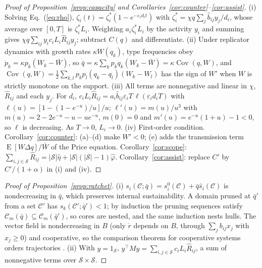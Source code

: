 \documentclass[letterpaper]{article} %
\theoremstyle{definition}
\newcommand{\cC}{\mathcal{C}}
\newcommand{\cS}{\mathcal{S}}
\begin{document}
\begin{proof}[Proof of Proposition~\ref{prop:capacity} and Corollaries~\ref{cor:counter}--\ref{cor:assist}]
(i) Solving Eq.~(\ref{eq:rho}), $\zeta_i(t)=\zeta^\ast_i(1-e^{-\varepsilon_id_it})$ with $\zeta^\ast_i=\chi q\sum_j\hat b_{ij}y_j/d_i$, whose average over $[0,T]$ is $\zeta^\ast_iL_i$. Weighting $a_i\zeta^\ast_iL_i$ by the activity $y_i$ and summing gives $\chi q\sum_{ij}y_ic_iL_i\hat R_{ij}y_j$; subtract $C(q)$ and differentiate. (ii) Under replicator dynamics with growth rates $\kappa W(q_k)$, type frequencies obey $\dot p_k=\kappa p_k(W_k-\bar W)$, so $\dot{\bar q}=\kappa\sum_kp_kq_k(W_k-\bar W)=\kappa\operatorname{Cov}(q,W)$, and $\operatorname{Cov}(q,W)=\tfrac12\sum_{k,l}p_kp_l(q_k-q_l)(W_k-W_l)$ has the sign of $W'$ when $W$ is strictly monotone on the support. (iii) All terms are nonnegative and linear in $\chi$, $\hat R_{ij}$ and each $y_j$. For $d_i$, $c_iL_i\hat R_{ij}=a_i\hat b_{ij}\varepsilon_iT\,\ell(\varepsilon_id_iT)$ with $\ell(u)=[1-(1-e^{-u})/u]/u$; $\ell'(u)=m(u)/u^3$ with $m(u)=2-2e^{-u}-u-ue^{-u}$, $m(0)=0$ and $m'(u)=e^{-u}(1+u)-1<0$, so $\ell$ is decreasing. As $T\to0$, $L_i\to0$. (iv) First-order condition. Corollary~\ref{cor:counter}: (a)--(d) make $W'<0$; (e) adds the transmission term $\operatorname{E}[W\Delta q]/\bar W$ of the Price equation. Corollary~\ref{cor:scope}: $\sum_{i,j\in\cS}\hat R_{ij}=|\cS|\hat\eta+|\cS|(|\cS|-1)\hat\varphi$. Corollary~\ref{cor:assist}: replace $C'$ by $C'/(1+\alpha)$ in (i) and (iv).
\end{proof}

\begin{proof}[Proof of Proposition~\ref{prop:ratchet}]
(i) $s_i(\cC;\bar q)=s^0_i(\cC)+\bar q\hat s_i(\cC)$ is nondecreasing in $\bar q$, which preserves internal sustainability. A domain pruned at $\bar q'$ from a set $\cC'$ has $s_k(\cC';\bar q')<1$; by induction the pruning sequences satisfy $\cC_m(\bar q)\subseteq\cC_m(\bar q')$, so cores are nested, and the same induction nests hulls. The vector field is nondecreasing in $B$ (only $\dot r$ depends on $B$, through $\sum_jb_{ij}x_j$ with $x_j\ge0$) and cooperative, so the comparison theorem for cooperative systems orders trajectories \citep{smith1995}. (ii) With $y=1_\cS$, $y^\top My=\sum_{i,j\in\cS}c_iL_i\hat R_{ij}$, a sum of nonnegative terms over $\cS\times\cS$.
\end{proof}
\end{document}
